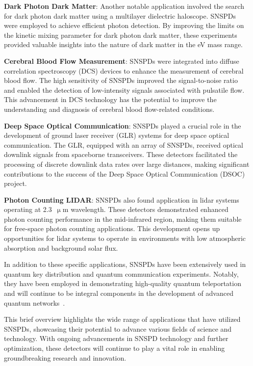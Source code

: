 \documentclass[11pt]{caltech_thesis} %
\begin{document}
\textbf{Dark Photon Dark Matter}: Another notable application involved the search for dark photon dark matter using a multilayer dielectric haloscope. SNSPDs were employed to achieve efficient photon detection. By improving the limits on the kinetic mixing parameter for dark photon dark matter, these experiments provided valuable insights into the nature of dark matter in the eV mass range.

\textbf{Cerebral Blood Flow Measurement}: SNSPDs were integrated into diffuse correlation spectroscopy (DCS) devices to enhance the measurement of cerebral blood flow. The high sensitivity of SNSPDs improved the signal-to-noise ratio and enabled the detection of low-intensity signals associated with pulsatile flow. This advancement in DCS technology has the potential to improve the understanding and diagnosis of cerebral blood flow-related conditions.

\textbf{Deep Space Optical Communication}: SNSPDs played a crucial role in the development of ground laser receiver (GLR) systems for deep space optical communication. The GLR, equipped with an array of SNSPDs, received optical downlink signals from spaceborne transceivers. These detectors facilitated the processing of discrete downlink data rates over large distances, making significant contributions to the success of the Deep Space Optical Communication (DSOC) project.

\textbf{Photon Counting LIDAR}: SNSPDs also found application in lidar systems operating at 2.3~$\upmu \mathrm{m}$ wavelength. These detectors demonstrated enhanced photon counting performance in the mid-infrared region, making them suitable for free-space photon counting applications. This development opens up opportunities for lidar systems to operate in environments with low atmospheric absorption and background solar flux.

In addition to these specific applications, SNSPDs have been extensively used in quantum key distribution and quantum communication experiments. Notably, they have been employed in demonstrating high-quality quantum teleportation~\autocite{Valivarthi2020} and will continue to be integral components in the development of advanced quantum networks~\autocite{Valivarthi2022}.

This brief overview highlights the wide range of applications that have utilized SNSPDs, showcasing their potential to advance various fields of science and technology. With ongoing advancements in SNSPD technology and further optimization, these detectors will continue to play a vital role in enabling groundbreaking research and innovation.
\end{document}

